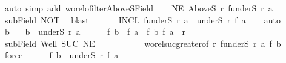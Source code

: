 \begin{isabellebody}
\ {\isacharparenleft}{\kern0pt}auto\ simp\ add{\isacharcolon}{\kern0pt}\ wo{\isacharunderscore}{\kern0pt}rel{\isachardot}{\kern0pt}ofilter{\isacharunderscore}{\kern0pt}AboveS{\isacharunderscore}{\kern0pt}Field{\isacharparenright}{\kern0pt}\isanewline
\ \ \isamarkupfalse%
\ NE{\isacharcolon}{\kern0pt}\ {\isachardoublequoteopen}AboveS\ r{\isacharprime}{\kern0pt}\ {\isacharparenleft}{\kern0pt}f{\isacharbackquote}{\kern0pt}{\isacharparenleft}{\kern0pt}underS\ r\ a{\isacharparenright}{\kern0pt}{\isacharparenright}{\kern0pt}\ {\isasymnoteq}\ {\isacharbraceleft}{\kern0pt}{\isacharbraceright}{\kern0pt}{\isachardoublequoteclose}\isanewline
\ \ \isamarkupfalse%
\ subField\ NOT\ \isamarkupfalse%
\ blast\isanewline
\ \ \isanewline
\ \ \isamarkupfalse%
\ INCL{}{\isacharcolon}{\kern0pt}\ {\isachardoublequoteopen}f{\isacharbackquote}{\kern0pt}{\isacharparenleft}{\kern0pt}underS\ r\ a{\isacharparenright}{\kern0pt}\ {\isasymle}\ underS\ r{\isacharprime}{\kern0pt}\ {\isacharparenleft}{\kern0pt}f\ a{\isacharparenright}{\kern0pt}\ {\isachardoublequoteclose}\isanewline
\ \ \isamarkupfalse%
{\isacharparenleft}{\kern0pt}auto{\isacharparenright}{\kern0pt}\isanewline
\ \ \ \ \isamarkupfalse%
\ b\ \isamarkupfalse%
\ {\isacharasterisk}{\kern0pt}{\isacharcolon}{\kern0pt}\ {\isachardoublequoteopen}b\ {\isasymin}\ underS\ r\ a{\isachardoublequoteclose}\isanewline
\ \ \ \ \isamarkupfalse%
\ {\isachardoublequoteopen}f\ b\ {\isasymnoteq}\ f\ a\ {\isasymand}\ {\isacharparenleft}{\kern0pt}f\ b{\isacharcomma}{\kern0pt}\ f\ a{\isacharparenright}{\kern0pt}\ {\isasymin}\ r{\isacharprime}{\kern0pt}{\isachardoublequoteclose}\isanewline
\ \ \ \ \isamarkupfalse%
\ subField\ Well{\isacharprime}{\kern0pt}\ SUC\ NE\ {\isacharasterisk}{\kern0pt}\isanewline
\ \ \ \ \ \ \ \ \ \ wo{\isacharunderscore}{\kern0pt}rel{\isachardot}{\kern0pt}suc{\isacharunderscore}{\kern0pt}greater{\isacharbrackleft}{\kern0pt}of\ r{\isacharprime}{\kern0pt}\ {\isachardoublequoteopen}f{\isacharbackquote}{\kern0pt}{\isacharparenleft}{\kern0pt}underS\ r\ a{\isacharparenright}{\kern0pt}{\isachardoublequoteclose}\ {\isachardoublequoteopen}f\ b{\isachardoublequoteclose}{\isacharbrackright}{\kern0pt}\ \isamarkupfalse%
\ force\isanewline
\ \ \ \ \isamarkupfalse%
\ {\isachardoublequoteopen}f\ b\ {\isasymin}\ underS\ r{\isacharprime}{\kern0pt}\ {\isacharparenleft}{\kern0pt}f\ a{\isacharparenright}{\kern0pt}{\isachardoublequoteclose}\isanewline

\end{isabellebody}

